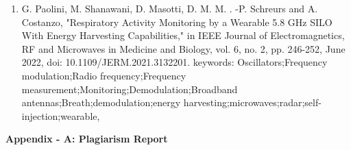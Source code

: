 \documentclass[12pt]{article}
\begin{document}
\begin{enumerate}
		\item G. Paolini, M. Shanawani, D. Masotti, D. M. M. . -P. Schreurs and A. Costanzo, "Respiratory Activity Monitoring by a Wearable 5.8 GHz SILO With Energy Harvesting Capabilities," in IEEE Journal of Electromagnetics, RF and Microwaves in Medicine and Biology, vol. 6, no. 2, pp. 246-252, June 2022, doi: 10.1109/JERM.2021.3132201.
keywords: {Oscillators;Frequency modulation;Radio frequency;Frequency measurement;Monitoring;Demodulation;Broadband antennas;Breath;demodulation;energy harvesting;microwaves;radar;self-injection;wearable},

\end{enumerate}

\newpage
\vspace*{\fill}%
\begin{center}
    \Large \textbf{Appendix - A: Plagiarism Report}
\end{center}
\vspace*{\fill}%
\end{document}

